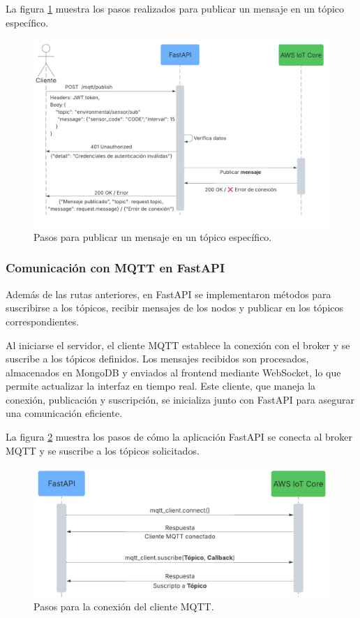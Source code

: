 La figura \ref{fig:publish_mqtt} muestra los pasos realizados para publicar un
mensaje en un tópico específico.

\begin{figure}[H]
    \centering
    \includegraphics[width=.90\textwidth]{./Images/21.png}
    \caption{Pasos para publicar un mensaje en un tópico específico.}
    \label{fig:publish_mqtt}
\end{figure}

\subsubsection{Comunicación con MQTT en FastAPI}

Además de las rutas anteriores, en FastAPI se implementaron métodos para
suscribirse a los tópicos, recibir mensajes de los nodos y publicar en los
tópicos correspondientes.

Al iniciarse el servidor, el cliente MQTT establece la conexión con el broker y
se suscribe a los tópicos definidos. Los mensajes recibidos son procesados,
almacenados en MongoDB y enviados al frontend mediante WebSocket, lo que
permite actualizar la interfaz en tiempo real. Este cliente, que maneja la
conexión, publicación y suscripción, se inicializa junto con FastAPI para
asegurar una comunicación eficiente.

La figura \ref{fig:cliente_mqtt} muestra los pasos de cómo la aplicación
FastAPI se conecta al broker MQTT y se suscribe a los tópicos solicitados.

\begin{figure}[H]
    \centering
    \includegraphics[width=.75\textwidth]{./Images/22.png}
    \caption{Pasos para la conexión del cliente MQTT.}
    \label{fig:cliente_mqtt}
\end{figure}

